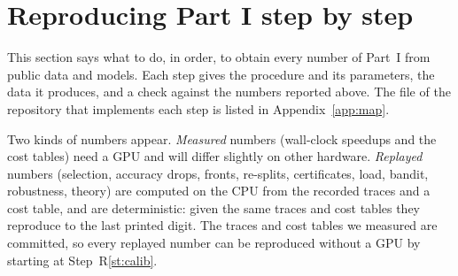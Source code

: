 \section{Reproducing Part I step by step}\label{sec:repro1}

This section says what to do, in order, to obtain every number of Part~I from public data and models. Each step
gives the procedure and its parameters, the data it produces, and a check against the numbers reported above. The
file of the repository that implements each step is listed in Appendix~\ref{app:map}.

Two kinds of numbers appear. \emph{Measured} numbers (wall-clock speedups and the cost tables) need a GPU and will
differ slightly on other hardware. \emph{Replayed} numbers (selection, accuracy drops, fronts, re-splits,
certificates, load, bandit, robustness, theory) are computed on the CPU from the recorded traces and a cost table,
and are deterministic: given the same traces and cost tables they reproduce to the last printed digit. The traces
and cost tables we measured are committed, so every replayed number can be reproduced without a GPU by starting at
Step~R\ref{st:calib}.

